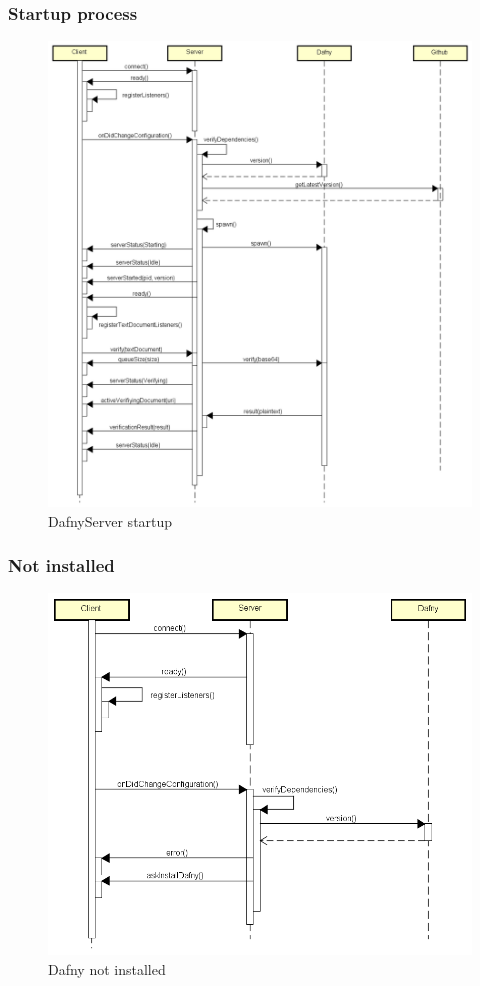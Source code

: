 \subsubsection{Startup process}
\begin{figure}[H]
	\centering
	\includegraphics[width=1\textwidth]{img/DafnyStartupFull}
	\caption{DafnyServer startup}
	\label{fig:DafnyServer startup}
\end{figure}

\subsubsection{Not installed}
\begin{figure}[H]
	\centering
	\includegraphics[width=1\textwidth]{img/DafnyNotInstalled}
	\caption{Dafny not installed}
	\label{fig:Dafny not installed}
\end{figure}

